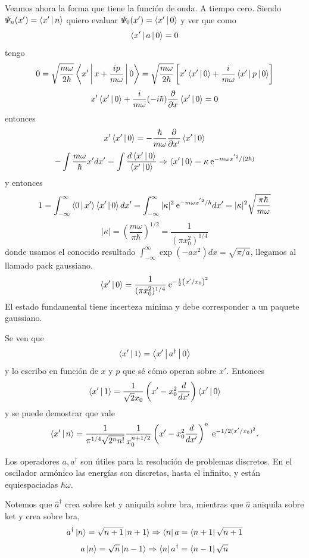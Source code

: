 \documentclass[10pt,oneside]{CBFT_book}
\begin{document}
Veamos ahora la forma que tiene la función de onda. A tiempo cero.
Siendo $\Psi_n(x') = \Braket{x'|n}$ quiero evaluar $\Psi_0(x') = \Braket{x'|0}$ y ver que como 
\[
	\Braket{x'|a|0}= 0 
\]
tengo 
\[
	0 = \sqrt{ \frac{m\omega}{2\hbar} } \Braket{x'|x+\frac{ip}{m\omega}|0} =
	\sqrt{ \frac{m\omega}{2\hbar} } \left[ x'\Braket{x'|0} + \frac{i}{m\omega}\Braket{x'|p|0} \right]
\]
\[
	x' \Braket{x'|0} + \frac{i}{m\omega} (-i\hbar) \frac{\partial^{\hspace{-0.05em}} {}}{\partial {x}^{\hspace{-0.05em}}} \Braket{x'|0} = 0
\]
entonces 
\[
	x' \Braket{x'|0} = - \frac{\hbar}{m\omega} \frac{\partial^{\hspace{-0.05em}} {}}{\partial {x'}^{\hspace{-0.05em}}}\Braket{x'|0} 
\]
\[
	- \int \frac{m\omega}{\hbar} x' dx' = \int \frac{d \Braket{x'|0}}{\Braket{x'|0}} \Rightarrow 
	\Braket{x'|0} = \kappa \:\mathrm{e}^{-m\omega x^{'2}/(2\hbar)}
\]
y entonces 
\[
	1 = \int_{-\infty}^{\infty} \Braket{0|x'}\Braket{x'|0} dx' = 
	\int_{-\infty}^{\infty} |\kappa|^2 \:\mathrm{e}^{-m\omega x^{'2}/\hbar} dx' =
	|\kappa|^2 \sqrt{\frac{\pi\hbar}{m\omega}} 
\]
\[
	|\kappa| = \left( \frac{m\omega}{\pi\hbar} \right)^{1/2} = \frac{1}{(\pi x_0^2)^{1/4}}
\]
donde usamos el conocido resultado $\int_{-\infty}^\infty \exp( - a x^2) dx = \sqrt{\pi/a}$, llegamos al 
llamado pack 
gaussiano.
\[
	\Braket{x'|0} = \frac{1}{(\pi x_0^2)^{1/4}} \:\mathrm{e}^{-\frac{1}{2}\left( x'/x_0 \right)^2}
\]
El estado fundamental tiene incerteza mínima y debe corresponder a un paquete gaussiano.

Se ven que 
\[
	\Braket{x'|1} = \Braket{x'|a^\dagger|0}
\]
y lo escribo en función de $x$ y $p$ que sé cómo operan sobre $x'$. Entonces
\[
	\Braket{x'|1} = \frac{1}{\sqrt{2}x_0} \left( x' - x_0^2 \frac{d^{\hspace{-0.05em}} {}}{d {x'}^{\hspace{-0.05em}}} \right) \Braket{x'|0}
\]
y se puede demostrar que vale
\[
	\Braket{x'|n} = \frac{1}{\pi^{1/4} \sqrt{2^n n!}} \frac{1}{x_0^{n+1/2}} 
	\left( x' - x_0^2 \frac{d^{\hspace{-0.05em}} {}}{d {x'}^{\hspace{-0.05em}}} \right)^n \:\mathrm{e}^{-1/2 (x'/x_0)^2}.
\]

Los operadores $a,a^\dagger$ son útiles para la resolución de problemas discretos.
En el oscilador armónico las energías son discretas, hasta el infinito, y están
equiespaciadas $\hbar \omega$.

Notemos que $\hat{a}^\dagger$ crea sobre ket y aniquila sobre bra, mientras que $\hat{a}$ aniquila 
sobre ket y crea sobre bra,
\[
	a^\dagger \Ket{n} = \sqrt{n+1} \Ket{n+1} \Rightarrow \Bra{n} a = \Bra{n+1} \sqrt{n+1}
\]
\[
	a \Ket{n} = \sqrt{n} \Ket{n-1} \Rightarrow \Bra{n} a^\dagger = \Bra{n-1} \sqrt{n}
\]
\end{document}
